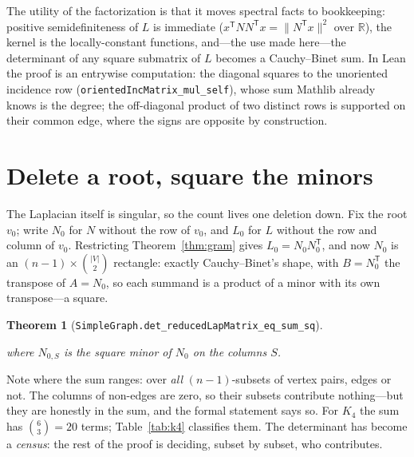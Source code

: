 \documentclass[11pt]{article}
\newtheorem{theorem}{Theorem}
\newcommand{\lean}[1]{\texttt{#1}}
\newcommand{\R}{\mathbb{R}}
\newcommand{\keyeq}[1]{\begin{center}\keybox{$\displaystyle #1$}\end{center}}
\begin{document}
The utility of the factorization is that it moves spectral facts to bookkeeping: positive
semidefiniteness of $L$ is immediate ($x^{\mathsf T}NN^{\mathsf T}x=\|N^{\mathsf T}x\|^2$ over
$\R$), the kernel is the locally-constant functions, and---the use made here---the determinant
of any square submatrix of $L$ becomes a Cauchy--Binet sum. In Lean the proof is an
entrywise computation: the diagonal squares to the unoriented incidence row
(\lean{orientedIncMatrix\_mul\_self}), whose sum Mathlib already knows is the degree; the
off-diagonal product of two distinct rows is supported on their common edge, where the signs are
opposite by construction.

\section{Delete a root, square the minors}
\label{sec:sum}

The Laplacian itself is singular, so the count lives one deletion down. Fix the root $v_0$;
write $N_0$ for $N$ without the row of $v_0$, and $L_0$ for $L$ without the row and column of
$v_0$. Restricting Theorem~\ref{thm:gram} gives $L_0=N_0N_0^{\mathsf T}$, and now $N_0$ is an
$(n-1)\times\binom{|V|}{2}$ rectangle: exactly Cauchy--Binet's shape, with $B=N_0^{\mathsf T}$
the transpose of $A=N_0$, so each summand is a product of a minor with its own transpose---a
square.

\begin{theorem}[{\lean{SimpleGraph.det\_reducedLapMatrix\_eq\_sum\_sq}}]
\label{thm:sum}
\keyeq{\det L_0\;=\;\sum_{\substack{S\subseteq\mathrm{Sym}^2V\\ |S|=n-1}}
  \bigl(\det N_{0,S}\bigr)^{2}}
where $N_{0,S}$ is the square minor of $N_0$ on the columns $S$.
\end{theorem}

Note where the sum ranges: over \emph{all} $(n-1)$-subsets of vertex pairs, edges or not. The
columns of non-edges are zero, so their subsets contribute nothing---but they are honestly in
the sum, and the formal statement says so. For $K_4$ the sum has $\binom{6}{3}=20$ terms;
Table~\ref{tab:k4} classifies them. The determinant has become a \emph{census}: the rest of the
proof is deciding, subset by subset, who contributes.
\end{document}
